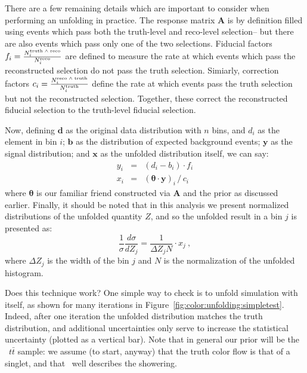 	There are a few remaining details which are important to consider when performing an unfolding in practice. The response matrix $\mathbf{A}$ is by definition filled using events which pass both the truth-level and reco-level selection-- but there are also events which pass only one of the two selections. Fiducial factors $f_{i} = \frac{N^{\rm truth\;\wedge\;reco}_{i}}{N^{\rm reco}_{i}}$ are defined to measure the rate at which events which pass the reconstructed selection do not pass the truth selection. Simiarly, correction factors $c_{i} = \frac{N^{\rm reco\;\wedge\;truth}_{i}}{N^{\rm truth}_{i}}$ define the rate at which events pass the truth selection but not the reconstructed selection. Together, these correct the reconstructed fiducial selection to the truth-level fiducial selection.

	Now, defining $\mathbf{d}$ as the original data distribution with $n$ bins, and $d_i$ as the element in bin $i$; $\mathbf{b}$ as the distribution of expected background events; $\mathbf{y}$ as the signal distribution; and $\mathbf{x}$ as the unfolded distribution itself, we can say:
%
\begin{equation}
\begin{array} {rcl}
  y_i & = & (d_i - b_i) \cdot f_i \\
    x_i & = & (\boldsymbol{\theta} \cdot \mathbf{y})_i\,/\,c_i
    \end{array}
\end{equation}
%
	where $\mathbf{\theta}$ is our familiar friend constructed via $\mathbf{A}$ and the prior as discussed earlier. Finally, it should be noted that in this analysis we present normalized distributions of the unfolded quantity $Z$, and so the unfolded result in a bin $j$ is presented as:
%
\begin{equation}
  \frac{1}{\sigma} \frac{d\sigma}{dZ_j} = \frac{1}{\Delta Z_j N} \cdot x_j \ ,
\end{equation}
%
where $\Delta Z_j$ is the width of the bin $j$ and $N$ is the normalization of the unfolded histogram.

Does this technique work? One simple way to check is to unfold simulation with itself, as shown for many iterations in Figure~\ref{fig:color:unfolding:simpletest}. Indeed, after one iteration the unfolded distribution matches the truth distribution, and additional uncertainties only serve to increase the statistical uncertainty (plotted as a vertical bar). Note that in general our prior will be the \PowPythia\ $t\bar{t}$ sample: we assume (to start, anyway) that the truth color flow is that of a singlet, and that \Pythia\ well describes the showering.

